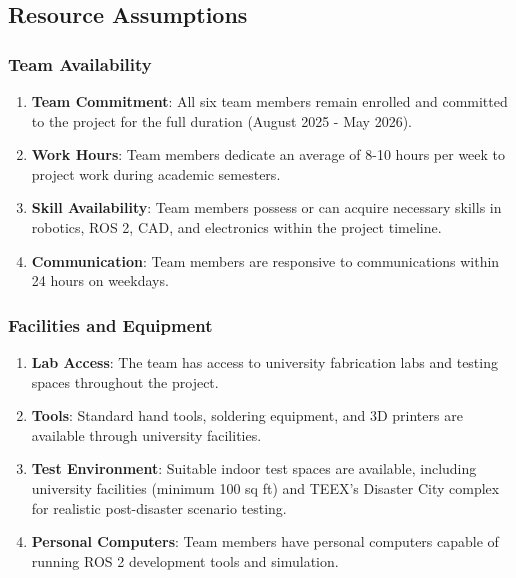 \subsection{Resource Assumptions}

\subsubsection{Team Availability}

\begin{enumerate}
    \item \textbf{Team Commitment}: All six team members remain enrolled and committed to the project for the full duration (August 2025 - May 2026).

    \item \textbf{Work Hours}: Team members dedicate an average of 8-10 hours per week to project work during academic semesters.

    \item \textbf{Skill Availability}: Team members possess or can acquire necessary skills in robotics, ROS 2, CAD, and electronics within the project timeline.

    \item \textbf{Communication}: Team members are responsive to communications within 24 hours on weekdays.
\end{enumerate}

\subsubsection{Facilities and Equipment}

\begin{enumerate}
    \item \textbf{Lab Access}: The team has access to university fabrication labs and testing spaces throughout the project.

    \item \textbf{Tools}: Standard hand tools, soldering equipment, and 3D printers are available through university facilities.

    \item \textbf{Test Environment}: Suitable indoor test spaces are available, including university facilities (minimum 100 sq ft) and TEEX's Disaster City complex for realistic post-disaster scenario testing.

    \item \textbf{Personal Computers}: Team members have personal computers capable of running ROS 2 development tools and simulation.
\end{enumerate}

